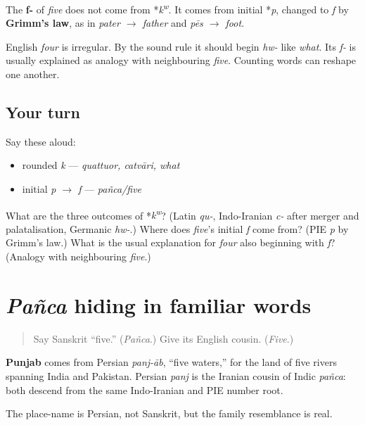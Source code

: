 \begin{cousinweb}
The \textbf{f-} of \emph{five} does not come from *\emph{k\textsuperscript{w}}. It comes from initial *\emph{p}, changed to \emph{f} by \textbf{Grimm's law}, as in \emph{pater $\to$ father} and \emph{pēs $\to$ foot}.

English \emph{four} is irregular. By the sound rule it should begin \emph{hw-} like \emph{what}. Its \emph{f-} is usually explained as analogy with neighbouring \emph{five}. Counting words can reshape one another.
\end{cousinweb}

\subsection*{Your turn}
Say these aloud:

\begin{itemize}
\raggedright
  \item rounded \emph{k} — \emph{quattuor, catvāri, what}
  \item initial \emph{p $\to$ f} — \emph{pañca/five}
\end{itemize}

\begin{tcolorbox}[breakable,colback=teal!4,colframe=teal!35!black,title={Before you move on}]
What are the three outcomes of *\emph{k\textsuperscript{w}}? (Latin \emph{qu-}, Indo-Iranian \emph{c-} after merger and palatalisation, Germanic \emph{hw-}.) Where does \emph{five}'s initial \emph{f} come from? (PIE \emph{p} by Grimm's law.) What is the usual explanation for \emph{four} also beginning with \emph{f}? (Analogy with neighbouring \emph{five}.)
\end{tcolorbox}
\section[\texorpdfstring{\sk{पञ्च} (pañca)}{पञ्च (pañca)}]{\emph{Pañca} hiding in familiar words}

\label{lesson:SA-C06-pancha-travels}



\begin{quote}
Say Sanskrit “five.” (\emph{Pañca}.) Give its English cousin. (\emph{Five}.)
\end{quote}

\begin{cousinweb}
\textbf{Punjab} comes from Persian \emph{panj-āb}, “five waters,” for the land of five rivers spanning India and Pakistan. Persian \emph{panj} is the Iranian cousin of Indic \emph{pañca}: both descend from the same Indo-Iranian and PIE number root.

The place-name is Persian, not Sanskrit, but the family resemblance is real.
\end{cousinweb}

